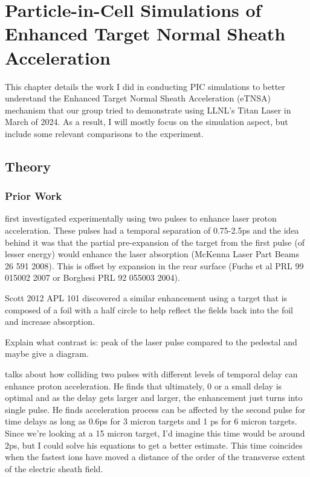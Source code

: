 \chapter{Particle-in-Cell Simulations of Enhanced Target Normal Sheath Acceleration} \label{ch:4}

This chapter details the work I did in conducting PIC simulations to better understand the Enhanced Target Normal Sheath Acceleration (eTNSA) mechanism that our group tried to demonstrate using LLNL's Titan Laser in March of 2024. As a result, I will mostly focus on the simulation aspect, but include some relevant comparisons to the experiment. 
\section{Theory}

\subsection{Prior Work}

\citep{Markey_2010_PRL} first investigated experimentally using two pulses to enhance laser proton acceleration. These pulses had a temporal separation of 0.75-2.5ps and the idea behind it was that the partial pre-expansion of the target from the first pulse (of lesser energy) would enhance the laser absorption (McKenna Laser Part Beams 26 591 2008). This is offset by expansion in the rear surface (Fuchs et al PRL 99 015002 2007 or Borghesi PRL 92 055003 2004).

Scott 2012 APL 101 discovered a similar enhancement using a target that is composed of a foil with a half circle to help reflect the fields back into the foil and increase absorption. 

Explain what contrast is: peak of the laser pulse compared to the pedestal and maybe give a diagram.


\citep{Ferri_2018_PoP} talks about how colliding two pulses with different levels of temporal delay can enhance proton acceleration. He finds that ultimately, 0 or a small delay is optimal and as the delay gets larger and larger, the enhancement just turns into single pulse. He finds acceleration process can be affected by the second pulse for time delays as long as 0.6ps for 3 micron targets and 1 ps for 6 micron targets. Since we're looking at a 15 micron target, I'd imagine this time would be around 2ps, but I could solve his equations to get a better estimate. This time coincides when the fastest ions have moved a distance of the order of the transverse extent of the electric sheath field.

